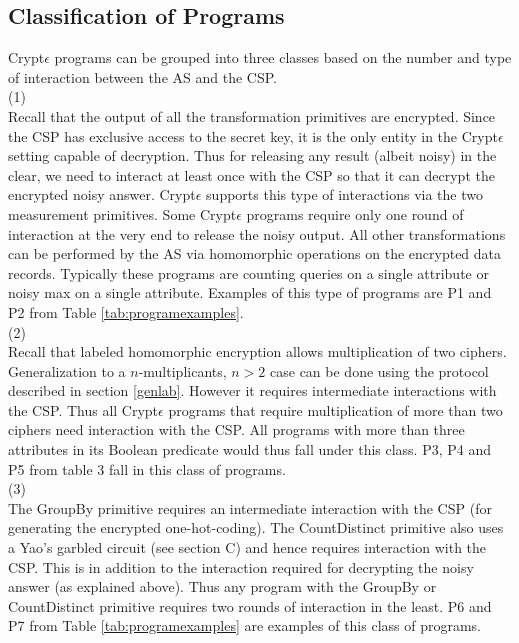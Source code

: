 \subsection{Classification of \system Programs}
Crypt$\epsilon$ programs can be grouped into three classes based on the number and type of interaction between the \textsf{AS} and the \textsf{CSP}.  \\
(1)\\
Recall that the output of all the transformation primitives are encrypted.  Since  the \textsf{CSP} has exclusive access to the secret key, it is the only entity in the Crypt$\epsilon$ setting capable of decryption. Thus for releasing any result (albeit noisy) in the clear, we need to interact at least once with the \textsf{CSP} so that it can decrypt the encrypted noisy answer. Crypt$\epsilon$ supports this type of interactions via the two measurement primitives. Some Crypt$\epsilon$ programs require only one round of interaction at the very end to release the noisy output. All other transformations can be performed by the \textsf{AS} via homomorphic operations on the encrypted data records. Typically these programs are counting queries on a single attribute or noisy max on a single attribute. Examples of this type of programs are P1 and P2 from Table \ref{tab:programexamples}.\\
(2)\\
Recall that labeled homomorphic encryption allows multiplication of two ciphers. Generalization to a $n$-multiplicants, $n > 2$ case can be done using the protocol described in section \ref{genlab}. However it requires intermediate interactions with the \textsf{CSP}. Thus all Crypt$\epsilon$ programs that require multiplication of more than two ciphers need interaction with the \textsf{CSP}. 
All programs with more than three attributes in its Boolean predicate would thus fall under this class. P3, P4 and P5 from table 3 fall in this class of \system programs.\\
(3)\\
 The \textsf{GroupBy} primitive requires an intermediate interaction with the \textsf{CSP} (for generating the encrypted one-hot-coding). The \textsf{CountDistinct} primitive also uses a Yao's garbled circuit (see section C) and hence requires  interaction with the \textsf{CSP}. This is in addition to the interaction required for decrypting the noisy answer (as explained above). Thus any program with the \textsf{GroupBy} or \textsf{CountDistinct} primitive requires two rounds of interaction in the least. P6 and P7 from Table \ref{tab:programexamples} are examples of this class of \system programs. \\
